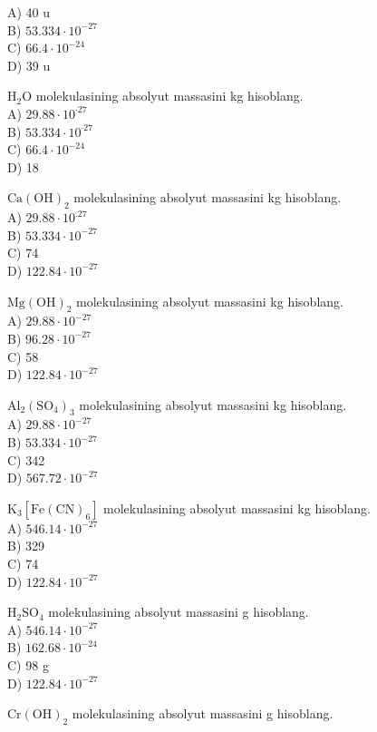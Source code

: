 A) 40 u\\
B) $53.334 \cdot 10^{-27}$\\
C) $66.4 \cdot 10^{-24}$\\
D) 39 u
  \item $\mathrm{H}_{2} \mathrm{O}$ molekulasining absolyut massasini kg hisoblang.\\
A) $29.88 \cdot 10^{\cdot 27}$\\
B) $53.334 \cdot 10^{\cdot 27}$\\
C) $66.4 \cdot 10^{-24}$\\
D) 18
  \item $\mathrm{Ca}(\mathrm{OH})_{2}$ molekulasining absolyut massasini kg hisoblang.\\
A) $29.88 \cdot 10^{.27}$\\
B) $53.334 \cdot 10^{-27}$\\
C) 74\\
D) $122.84 \cdot 10^{-27}$
  \item $\mathrm{Mg}(\mathrm{OH})_{2}$ molekulasining absolyut massasini kg hisoblang.\\
A) $29.88 \cdot 10^{-27}$\\
B) $96.28 \cdot 10^{-27}$\\
C) 58\\
D) $122.84 \cdot 10^{-27}$
  \item $\mathrm{Al}_{2}\left(\mathrm{SO}_{4}\right)_{3}$ molekulasining absolyut massasini kg hisoblang.\\
A) $29.88 \cdot 10^{-27}$\\
B) $53.334 \cdot 10^{-27}$\\
C) 342\\
D) $567.72 \cdot 10^{-27}$
  \item $\mathrm{K}_{3}\left[\mathrm{Fe}(\mathrm{CN})_{6}\right]$ molekulasining absolyut massasini kg hisoblang.\\
A) $546.14 \cdot 10^{-27}$\\
B) 329\\
C) 74\\
D) $122.84 \cdot 10^{-27}$
  \item $\mathrm{H}_{2} \mathrm{SO}_{4}$ molekulasining absolyut massasini g hisoblang.\\
A) $546.14 \cdot 10^{-27}$\\
B) $162.68 \cdot 10^{-24}$\\
C) 98 g\\
D) $122.84 \cdot 10^{-27}$
  \item $\mathrm{Cr}(\mathrm{OH})_{2}$ molekulasining absolyut massasini g hisoblang.\\
